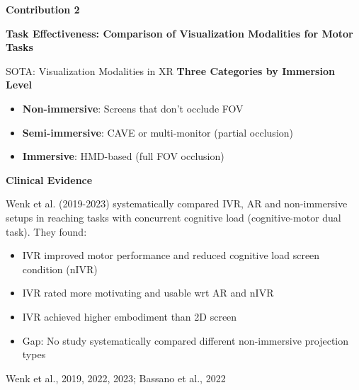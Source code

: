 \documentclass[aspectratio=169, 12pt]{beamer}
\newcommand{\citefooter}[1]{\hfill{\tiny #1}}
\begin{document}
\begin{frame}[plain]
	\vfill
	\begin{center}
		{\large \textcolor{gbAqua}{\textbf{Contribution 2}}}
		
		\vspace{0.4cm}
		
		{\LARGE \textbf{Task Effectiveness: Comparison of Visualization Modalities for Motor Tasks}}
		
	\end{center}
	\vfill
\end{frame}

\begin{frame}{SOTA: Visualization Modalities in XR}
	\textbf{\textcolor{gbAqua}{Three Categories by Immersion Level}}
	
	\begin{itemize}
		\item \textbf{Non-immersive}: Screens that don't occlude FOV
		\item \textbf{Semi-immersive}: CAVE or multi-monitor (partial occlusion)
		\item \textbf{Immersive}: HMD-based (full FOV occlusion)
	\end{itemize}
	
	\vspace{0.3cm}
	
	\textbf{\textcolor{gbAqua}{Clinical Evidence}}
	
	Wenk et al. (2019-2023) systematically compared IVR, AR and non-immersive setups in reaching tasks with concurrent cognitive load (cognitive-motor dual task). They found:
	
	\begin{itemize}
		\item IVR improved motor performance and reduced cognitive load screen condition (nIVR)
		\item IVR rated more motivating and usable wrt AR and nIVR 
		\item IVR achieved higher embodiment than 2D screen 
		\item Gap: No study systematically compared different non-immersive projection types
	\end{itemize}
	
	\citefooter{Wenk et al., 2019, 2022, 2023; Bassano et al., 2022}
\end{frame}
\end{document}
